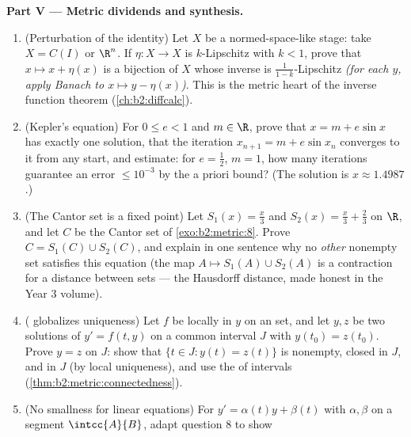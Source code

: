 \begin{problem}
\medskip
\noindent\textbf{Part V --- Metric dividends and synthesis.}
\begin{enumerate}[resume]
  \item (Perturbation of the identity) Let $X$ be a 
        normed-space-like stage: take $X = C(I)$ or $\R^n$. If
        $\eta \colon X \to X$ is $k$-Lipschitz with $k < 1$,
        prove that $x \mapsto x + \eta(x)$ is a bijection of $X$
        whose inverse is $\frac1{1-k}$-Lipschitz \emph{(for each
        $y$, apply Banach to $x \mapsto y - \eta(x)$)}. This is
        the metric heart of the inverse function theorem
        (\cref{ch:b2:diffcalc}).
  \item (Kepler's equation) For $0 \leq e < 1$ and $m \in \R$,
        prove that $x = m + e\sin x$ has exactly one solution,
        that the iteration $x_{n+1} = m + e\sin x_n$ converges
        to it from any start, and estimate: for $e = \frac12$,
        $m = 1$, how many iterations guarantee an error $\leq
        10^{-3}$ by the a priori bound? (The solution is $x
        \approx 1.4987$.)
  \item (The Cantor set is a fixed point) Let $S_1(x) = \frac
        x3$ and $S_2(x) = \frac x3 + \frac23$ on $\R$, and let
        $C$ be the Cantor set of \cref{exo:b2:metric:8}. Prove
        $C = S_1(C) \cup S_2(C)$, and explain in one sentence
        why no \emph{other} nonempty  set satisfies this
        equation (the map $A \mapsto S_1(A) \cup S_2(A)$ is a
        contraction for a distance between  sets --- the
        Hausdorff distance, made honest in the Year 3 volume).
  \item ( globalizes uniqueness) Let $f$ be locally
         in $y$ on an  set, and let $y, z$ be two
        solutions of $y' = f(t, y)$ on a common interval $J$
        with $y(t_0) = z(t_0)$. Prove $y = z$ on $J$: show that
        $\{t \in J : y(t) = z(t)\}$ is nonempty, closed in $J$,
        and  in $J$ (by local uniqueness), and use the
         of intervals
        (\cref{thm:b2:metric:connectedness}).
  \item (No smallness for linear equations) For $y' =
        \alpha(t)y + \beta(t)$ with $\alpha, \beta$ 
        on a segment $\intcc{A}{B}$, adapt question 8 to show

\end{enumerate}
\end{problem}
